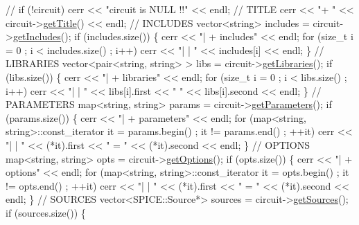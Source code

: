 \begin{DoxyCodeInclude}
\textcolor{comment}{//    if (!circuit) cerr << "circuit is NULL !!" << endl;}
    \textcolor{comment}{// TITLE}
    cerr << \textcolor{stringliteral}{"+ "} << circuit->\mbox{\hyperlink{class_s_p_i_c_e_1_1_circuit_ad19721dd878c04c854a72af12d785741}{getTitle}}() << endl;
    \textcolor{comment}{// INCLUDES}
    vector<string> includes = circuit->\mbox{\hyperlink{class_s_p_i_c_e_1_1_circuit_a312beaf640e84589e6644820355c8ed6}{getIncludes}}();
    \textcolor{keywordflow}{if} (includes.size()) \{
        cerr << \textcolor{stringliteral}{"| + includes"} << endl;
        \textcolor{keywordflow}{for} (\textcolor{keywordtype}{size\_t} i = 0 ; i < includes.size() ; i++)
            cerr << \textcolor{stringliteral}{"| | "} << includes[i] << endl;
    \}
    \textcolor{comment}{// LIBRARIES}
    vector<pair<string, string> > libs = circuit->\mbox{\hyperlink{class_s_p_i_c_e_1_1_circuit_a3e6a71a711e4796470f1a2a1dc42aef6}{getLibraries}}();
    \textcolor{keywordflow}{if} (libs.size()) \{
        cerr << \textcolor{stringliteral}{"| + libraries"} << endl;
        \textcolor{keywordflow}{for} (\textcolor{keywordtype}{size\_t} i = 0 ; i < libs.size() ; i++)
            cerr << \textcolor{stringliteral}{"| | "} << libs[i].first << \textcolor{stringliteral}{" "} << libs[i].second << endl;
    \}
    \textcolor{comment}{// PARAMETERS}
    map<string, string> params = circuit->\mbox{\hyperlink{class_s_p_i_c_e_1_1_circuit_a4c46676f9ead2db537a0dd963b4f08f1}{getParameters}}();
    \textcolor{keywordflow}{if} (params.size()) \{
        cerr << \textcolor{stringliteral}{"| + parameters"} << endl;
        \textcolor{keywordflow}{for} (map<string, string>::const\_iterator it = params.begin() ; it != params.end() ; ++it)
            cerr << \textcolor{stringliteral}{"| | "} << (*it).first << \textcolor{stringliteral}{" = "} << (*it).second << endl;
    \}
    \textcolor{comment}{// OPTIONS}
    map<string, string> opts = circuit->\mbox{\hyperlink{class_s_p_i_c_e_1_1_circuit_a4ee11ef79ef893c5621e0e7d26a7f9a7}{getOptions}}();
    \textcolor{keywordflow}{if} (opts.size()) \{
        cerr << \textcolor{stringliteral}{"| + options"} << endl;
        \textcolor{keywordflow}{for} (map<string, string>::const\_iterator it = opts.begin() ; it != opts.end() ; ++it)
            cerr << \textcolor{stringliteral}{"| | "} << (*it).first << \textcolor{stringliteral}{" = "} << (*it).second << endl;
    \}
    \textcolor{comment}{// SOURCES}
    vector<SPICE::Source*> sources = circuit->\mbox{\hyperlink{class_s_p_i_c_e_1_1_circuit_ac18caa525ed386c44874ee643c88e27b}{getSources}}();
    \textcolor{keywordflow}{if} (sources.size()) \{

\end{DoxyCodeInclude}
